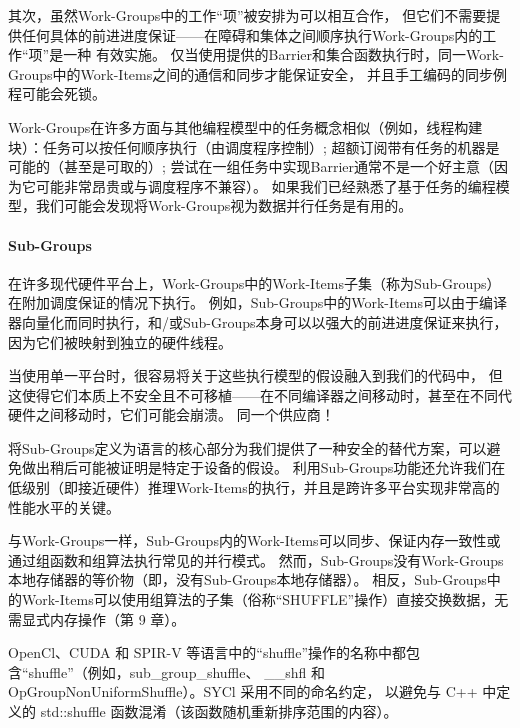 其次，虽然Work-Groups中的工作“项”被安排为可以相互合作，
但它们不需要提供任何具体的前进进度保证——在障碍和集体之间顺序执行Work-Groups内的工作“项”是一种 有效实施。 
仅当使用提供的Barrier和集合函数执行时，同一Work-Groups中的Work-Items之间的通信和同步才能保证安全，
并且手工编码的同步例程可能会死锁。

\begin{remark}
	Work-Groups在许多方面与其他编程模型中的任务概念相似（例如，线程构建块）：任务可以按任何顺序执行（由调度程序控制）;
	超额订阅带有任务的机器是可能的（甚至是可取的）;
	尝试在一组任务中实现Barrier通常不是一个好主意（因为它可能非常昂贵或与调度程序不兼容）。
	如果我们已经熟悉了基于任务的编程模型，我们可能会发现将Work-Groups视为数据并行任务是有用的。
\end{remark}

\paragraph{Sub-Groups}

在许多现代硬件平台上，Work-Groups中的Work-Items子集（称为Sub-Groups）在附加调度保证的情况下执行。 
例如，Sub-Groups中的Work-Items可以由于编译器向量化而同时执行，和/或Sub-Groups本身可以以强大的前进进度保证来执行，
因为它们被映射到独立的硬件线程。

当使用单一平台时，很容易将关于这些执行模型的假设融入到我们的代码中，
但这使得它们本质上不安全且不可移植——在不同编译器之间移动时，甚至在不同代硬件之间移动时，它们可能会崩溃。 同一个供应商！

将Sub-Groups定义为语言的核心部分为我们提供了一种安全的替代方案，可以避免做出稍后可能被证明是特定于设备的假设。 
利用Sub-Groups功能还允许我们在低级别（即接近硬件）推理Work-Items的执行，并且是跨许多平台实现非常高的性能水平的关键。

与Work-Groups一样，Sub-Groups内的Work-Items可以同步、保证内存一致性或通过组函数和组算法执行常见的并行模式。 
然而，Sub-Groups没有Work-Groups本地存储器的等价物（即，没有Sub-Groups本地存储器）。 
相反，Sub-Groups中的Work-Items可以使用组算法的子集（俗称“SHUFFLE”操作）直接交换数据，无需显式内存操作（第 9 章）。

\begin{remark}
	OpenCl、CUDA 和 SPIR-V 等语言中的“shuffle”操作的名称中都包含“shuffle”（例如，sub\_group\_shuffle、
	\_\_shfl 和 OpGroupNonUniformShuffle）。SYCl 采用不同的命名约定，
	以避免与 C++ 中定义的 std::shuffle 函数混淆（该函数随机重新排序范围的内容）。
\end{remark}

